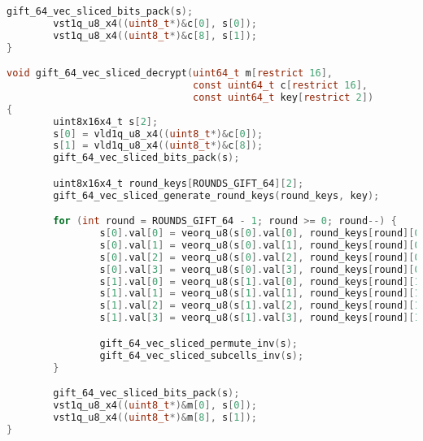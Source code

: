 \begin{lstlisting}[language=c, caption={gift\_vec\_sliced.c}]
        gift_64_vec_sliced_bits_pack(s);
        vst1q_u8_x4((uint8_t*)&c[0], s[0]);
        vst1q_u8_x4((uint8_t*)&c[8], s[1]);
}

void gift_64_vec_sliced_decrypt(uint64_t m[restrict 16],
                                const uint64_t c[restrict 16],
                                const uint64_t key[restrict 2])
{
        uint8x16x4_t s[2];
        s[0] = vld1q_u8_x4((uint8_t*)&c[0]);
        s[1] = vld1q_u8_x4((uint8_t*)&c[8]);
        gift_64_vec_sliced_bits_pack(s);

        uint8x16x4_t round_keys[ROUNDS_GIFT_64][2];
        gift_64_vec_sliced_generate_round_keys(round_keys, key);

        for (int round = ROUNDS_GIFT_64 - 1; round >= 0; round--) {
                s[0].val[0] = veorq_u8(s[0].val[0], round_keys[round][0].val[0]);
                s[0].val[1] = veorq_u8(s[0].val[1], round_keys[round][0].val[1]);
                s[0].val[2] = veorq_u8(s[0].val[2], round_keys[round][0].val[2]);
                s[0].val[3] = veorq_u8(s[0].val[3], round_keys[round][0].val[3]);
                s[1].val[0] = veorq_u8(s[1].val[0], round_keys[round][1].val[0]);
                s[1].val[1] = veorq_u8(s[1].val[1], round_keys[round][1].val[1]);
                s[1].val[2] = veorq_u8(s[1].val[2], round_keys[round][1].val[2]);
                s[1].val[3] = veorq_u8(s[1].val[3], round_keys[round][1].val[3]);

                gift_64_vec_sliced_permute_inv(s);
                gift_64_vec_sliced_subcells_inv(s);
        }

        gift_64_vec_sliced_bits_pack(s);
        vst1q_u8_x4((uint8_t*)&m[0], s[0]);
        vst1q_u8_x4((uint8_t*)&m[8], s[1]);
}
\end{lstlisting}
